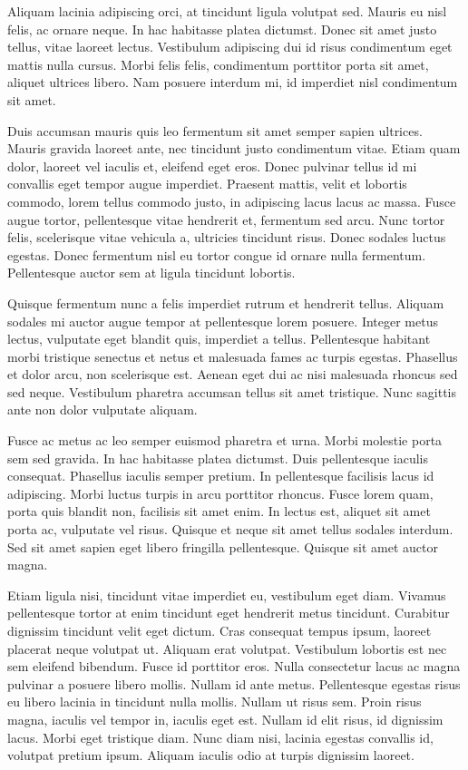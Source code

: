 \documentclass[a4paper]{article}
\begin{document}
Aliquam lacinia adipiscing orci, at tincidunt ligula volutpat sed. Mauris eu nisl felis, ac ornare neque. In hac habitasse platea dictumst. Donec sit amet justo tellus, vitae laoreet lectus. Vestibulum adipiscing dui id risus condimentum eget mattis nulla cursus. Morbi felis felis, condimentum porttitor porta sit amet, aliquet ultrices libero. Nam posuere interdum mi, id imperdiet nisl condimentum sit amet.

Duis accumsan mauris quis leo fermentum sit amet semper sapien ultrices. Mauris gravida laoreet ante, nec tincidunt justo condimentum vitae. Etiam quam dolor, laoreet vel iaculis et, eleifend eget eros. Donec pulvinar tellus id mi convallis eget tempor augue imperdiet. Praesent mattis, velit et lobortis commodo, lorem tellus commodo justo, in adipiscing lacus lacus ac massa. Fusce augue tortor, pellentesque vitae hendrerit et, fermentum sed arcu. Nunc tortor felis, scelerisque vitae vehicula a, ultricies tincidunt risus. Donec sodales luctus egestas. Donec fermentum nisl eu tortor congue id ornare nulla fermentum. Pellentesque auctor sem at ligula tincidunt lobortis.

Quisque fermentum nunc a felis imperdiet rutrum et hendrerit tellus. Aliquam sodales mi auctor augue tempor at pellentesque lorem posuere. Integer metus lectus, vulputate eget blandit quis, imperdiet a tellus. Pellentesque habitant morbi tristique senectus et netus et malesuada fames ac turpis egestas. Phasellus et dolor arcu, non scelerisque est. Aenean eget dui ac nisi malesuada rhoncus sed sed neque. Vestibulum pharetra accumsan tellus sit amet tristique. Nunc sagittis ante non dolor vulputate aliquam.

Fusce ac metus ac leo semper euismod pharetra et urna. Morbi molestie porta sem sed gravida. In hac habitasse platea dictumst. Duis pellentesque iaculis consequat. Phasellus iaculis semper pretium. In pellentesque facilisis lacus id adipiscing. Morbi luctus turpis in arcu porttitor rhoncus. Fusce lorem quam, porta quis blandit non, facilisis sit amet enim. In lectus est, aliquet sit amet porta ac, vulputate vel risus. Quisque et neque sit amet tellus sodales interdum. Sed sit amet sapien eget libero fringilla pellentesque. Quisque sit amet auctor magna.

Etiam ligula nisi, tincidunt vitae imperdiet eu, vestibulum eget diam. Vivamus pellentesque tortor at enim tincidunt eget hendrerit metus tincidunt. Curabitur dignissim tincidunt velit eget dictum. Cras consequat tempus ipsum, laoreet placerat neque volutpat ut. Aliquam erat volutpat. Vestibulum lobortis est nec sem eleifend bibendum. Fusce id porttitor eros. Nulla consectetur lacus ac magna pulvinar a posuere libero mollis. Nullam id ante metus. Pellentesque egestas risus eu libero lacinia in tincidunt nulla mollis. Nullam ut risus sem. Proin risus magna, iaculis vel tempor in, iaculis eget est. Nullam id elit risus, id dignissim lacus. Morbi eget tristique diam. Nunc diam nisi, lacinia egestas convallis id, volutpat pretium ipsum. Aliquam iaculis odio at turpis dignissim laoreet.
\end{document}
